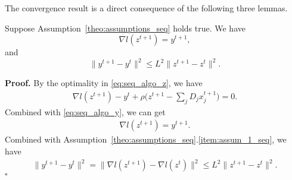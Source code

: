 The convergence result is a direct consequence of the following three lemmas. 
\begin{lemma}\label{lemma:y_diff_bound}
Suppose Assumption~\ref{theo:assumptions_seq} holds true. We have 
\[
    \nabla l(z^{t+1}) = y^{t+1},
\]
and 
\[
    \|y^{t+1} - y^t\|^2 \le L^2\|z^{t+1} - z^{t}\|^2.
\]
\end{lemma}
{\bf Proof.} By the optimality in \eqref{eq:seq_algo_z}, we have 
\begin{align}
    \nabla l(z^{t+1}) - y^t + \rho\big(z^{t+1} - \sum_j D_j x_j^{t+1}\big) = 0.\nonumber
\end{align}
Combined with \eqref{eq:seq_algo_y}, we can get 
\begin{align}
    \nabla l(z^{t+1}) = y^{t+1}.
\end{align}
Combined with Assumption~\ref{theo:assumptions_seq}.\ref{item:assum_1_seq}, we have
\begin{align}
\|y^{t+1} - y^{t}\|^2 = \|\nabla l(z^{t+1}) - \nabla l(z^{t})\|^2 \le L^2\|z^{t+1} - z^t\|^2.
\end{align}
\hfill$\square$


